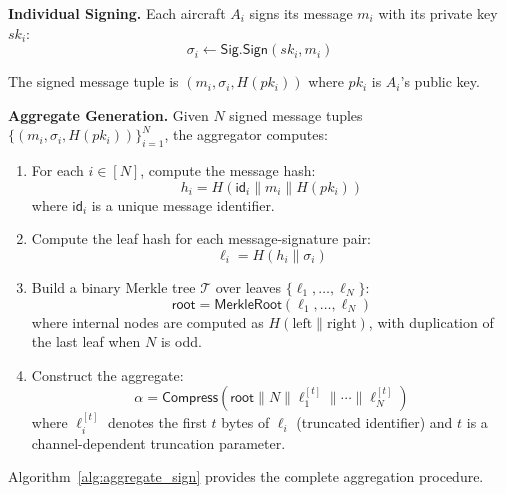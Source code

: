 \documentclass[conference,10pt]{IEEEtran}
\begin{document}
\textbf{Individual Signing.} Each aircraft $A_i$ signs its message $m_i$ with its private key $sk_i$:
\begin{equation}
    \sigma_i \leftarrow \mathsf{Sig.Sign}(sk_i, m_i)
\end{equation}

The signed message tuple is $(m_i, \sigma_i, H(pk_i))$ where $pk_i$ is $A_i$'s public key.

\textbf{Aggregate Generation.} Given $N$ signed message tuples $\{(m_i, \sigma_i, H(pk_i))\}_{i=1}^{N}$, the aggregator computes:

\begin{enumerate}
    \item For each $i \in [N]$, compute the message hash:
    \begin{equation}
        h_i = H(\mathsf{id}_i \| m_i \| H(pk_i))
    \end{equation}
    where $\mathsf{id}_i$ is a unique message identifier.

    \item Compute the leaf hash for each message-signature pair:
    \begin{equation}
        \ell_i = H(h_i \| \sigma_i)
    \end{equation}

    \item Build a binary Merkle tree $\mathcal{T}$ over leaves $\{\ell_1, \ldots, \ell_N\}$:
    \begin{equation}
        \mathsf{root} = \mathsf{MerkleRoot}(\ell_1, \ldots, \ell_N)
    \end{equation}
    where internal nodes are computed as $H(\text{left} \| \text{right})$, with duplication of the last leaf when $N$ is odd.

    \item Construct the aggregate:
    \begin{equation}
        \alpha = \mathsf{Compress}\left(\mathsf{root} \| N \| \ell_1^{[t]} \| \cdots \| \ell_N^{[t]}\right)
    \end{equation}
    where $\ell_i^{[t]}$ denotes the first $t$ bytes of $\ell_i$ (truncated identifier) and $t$ is a channel-dependent truncation parameter.
\end{enumerate}

Algorithm~\ref{alg:aggregate_sign} provides the complete aggregation procedure.
\end{document}
